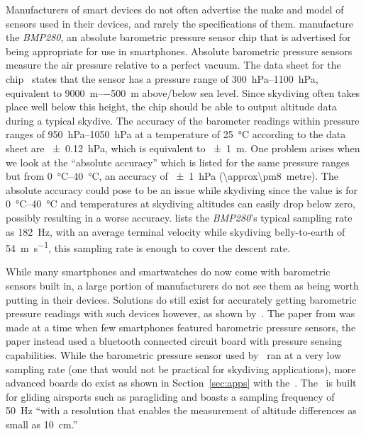 \documentclass[twocolumn]{article}
\begin{document}
Manufacturers of smart devices do not often advertise the make and model of sensors used in their devices, and rarely the specifications of them. \citeauthor{bosch_bmp280:_2016} manufacture the \textit{BMP280}, an absolute barometric pressure sensor chip that is advertised for being appropriate for use in smartphones. Absolute barometric pressure sensors measure the air pressure relative to a perfect vacuum. The data sheet for the chip~\cite{bosch_bmp280:_2016} states that the sensor has a pressure range of \SIrange{300}{1100}{\hecto\pascal}, equivalent to \SIrange{+9000}{-500}{\metre} above/below sea level. Since skydiving often takes place well below this height, the chip should be able to output altitude data during a typical skydive. The accuracy of the barometer readings within pressure ranges of \SIrange{950}{1050}{\hecto\pascal} at a temperature of \SI{25}{\degreeCelsius} according to the data sheet are \SI{\pm0.12}{\hecto\pascal}, which is equivalent to \SI{\pm1}{\metre}. One problem arises when we look at the ``absolute accuracy'' which is listed for the same pressure ranges but from \SIrange{0}{40}{\degreeCelsius}, an accuracy of \SI{\pm1}{\hecto\pascal} (\SI{\approx\pm8}{metre}). The absolute accuracy could pose to be an issue while skydiving since the value is for \SIrange{0}{40}{\degreeCelsius} and temperatures at skydiving altitudes can easily drop below zero, possibly resulting in a worse accuracy. \citeauthor{bosch_bmp280:_2016} lists the \textit{BMP280}'s typical sampling rate as \SI{182}{\Hz}, with an average terminal velocity while skydiving belly-to-earth of \SI{54}{\metre\per\second}, this sampling rate is enough to cover the descent rate.

While many smartphones and smartwatches do now come with barometric sensors built in, a large portion of manufacturers do not see them as being worth putting in their devices. Solutions do still exist for accurately getting barometric pressure readings with such devices however, as shown by~\textcite{he_atmospheric_2012}. The paper from \citeyear{he_atmospheric_2012} was made at a time when few smartphones featured barometric pressure sensors, the paper instead used a bluetooth connected circuit board with pressure sensing capabilities. While the barometric pressure sensor used by~\textcite{he_atmospheric_2012} ran at a very low sampling rate (one that would not be practical for skydiving applications), more advanced boards do exist as shown in Section~\ref{sec:apps} with the~.
The~ is built for gliding airsports such as paragliding and boasts a sampling frequency of \SI{50}{\Hz} ``with a resolution that enables the measurement of altitude differences as small as \SI{10}{\cm}.''
\end{document}
